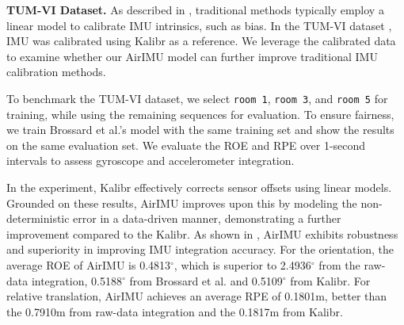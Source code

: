 \textbf{TUM-VI Dataset.}
As described in , traditional methods typically employ a linear model to calibrate IMU intrinsics, such as bias. In the TUM-VI dataset \cite{schubert2018tum}, IMU was calibrated using Kalibr \cite{rehder2016extending} as a reference.
We leverage the calibrated data to examine whether our AirIMU model can further improve traditional IMU calibration methods.

To benchmark the TUM-VI dataset, we select \texttt{room 1}, \texttt{room 3}, and \texttt{room 5} for training, while using the remaining sequences for evaluation. 
To ensure fairness, we train Brossard et al.'s model with the same training set and show the results on the same evaluation set.
We evaluate the ROE and RPE over 1-second intervals to assess gyroscope and accelerometer integration. 

\begin{table}[!t]
    \caption{The ROE (Unit: \si{\degree}) and RPE (Unit: meter) of IMU Pre-integration over 1 second (200 frames) on the TUMVI dataset.}
    \label{Tab: TUM-Kalibr}
    \centering
\end{table}

In the experiment, Kalibr effectively corrects sensor offsets using linear models.
Grounded on these results, AirIMU improves upon this by modeling the non-deterministic error in a data-driven manner, demonstrating a further improvement compared to the Kalibr. 
As shown in , AirIMU exhibits robustness and superiority in improving IMU integration accuracy. 
For the orientation, the average ROE of AirIMU is 0.4813$^{\circ}$, which is superior to 2.4936$^{\circ}$ from the raw-data integration, 0.5188$^{\circ}$ from Brossard et al. and 0.5109$^{\circ}$ from Kalibr. 
For relative translation, AirIMU achieves an average RPE of 0.1801\si{\meter}, better than the 0.7910\si{\meter} from raw-data integration and the 0.1817\si{\meter} from Kalibr.

